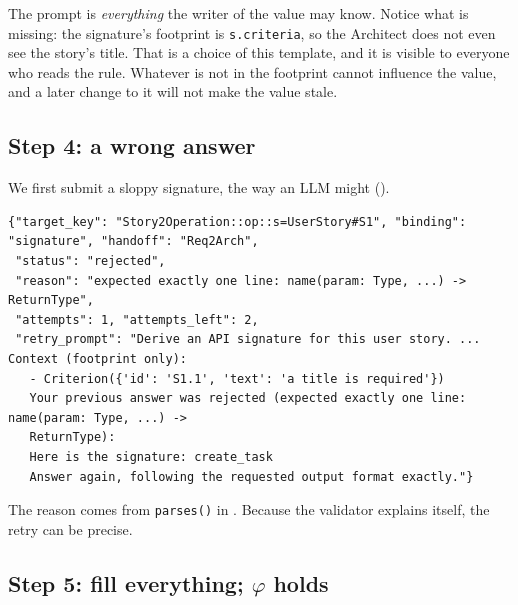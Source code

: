 \documentclass[10pt,a4paper]{article}
\newcommand{\code}[1]{\texttt{#1}}
\begin{document}
The prompt is \emph{everything} the writer of the value may know. Notice what
is missing: the signature's footprint is \code{s.criteria}, so the Architect
does not even see the story's title. That is a choice of this template, and
it is visible to everyone who reads the rule. Whatever is not in the
footprint cannot influence the value, and a later change to it will not make
the value stale.

\subsection{Step 4: a wrong answer}

We first submit a sloppy signature, the way an LLM might
().

\begin{lstlisting}[style=engine, caption={Observed: \code{submit\_binding} with the value ``Here is the signature: create\_task''.}, label={lst:w1reject}]
{"target_key": "Story2Operation::op::s=UserStory#S1", "binding": "signature", "handoff": "Req2Arch",
 "status": "rejected",
 "reason": "expected exactly one line: name(param: Type, ...) -> ReturnType",
 "attempts": 1, "attempts_left": 2,
 "retry_prompt": "Derive an API signature for this user story. ... Context (footprint only):
   - Criterion({'id': 'S1.1', 'text': 'a title is required'})
   Your previous answer was rejected (expected exactly one line: name(param: Type, ...) ->
   ReturnType):
   Here is the signature: create_task
   Answer again, following the requested output format exactly."}
\end{lstlisting}

The reason comes from \code{parses()} in . Because the
validator explains itself, the retry can be precise.

\subsection{Step 5: fill everything; $\varphi$ holds}
\end{document}
